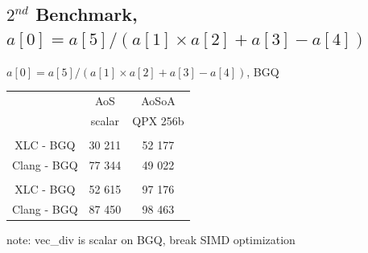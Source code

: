 \documentclass{beamer}
\begin{document}
\subsection*{$2^{nd}$ Benchmark, $a[0] = a[5]/(a[1] \times a[2]+a[3]-a[4])$}
\begin{frame}[fragile]
\centering
$a[0] = a[5]/(a[1] \times a[2]+a[3]-a[4])$, BGQ
\vspace{0.5cm}

\begin{tabular}{ c  c | c  }
         & AoS& AoSoA\\
                        &   scalar &  QPX 256b \\
\hline
\color{C0}{float}   & & \\
   XLC - BGQ   &  \cellcolor{C2}30 211 &         52 177  \\
   Clang - BGQ   &  77 344 &         \cellcolor{C2}49 022  \\
   \hline
    \color{C0}{double}                        &  &   \\
   XLC - BGQ   &  \cellcolor{C2}52 615 &        97 176  \\
   Clang - BGQ   &    \cellcolor{C2} 87 450 &       98 463 \\
\hline

\end{tabular}

\vspace{0.5cm}

note: vec\_div is scalar on BGQ, break SIMD optimization

\end{frame}

\end{document}
